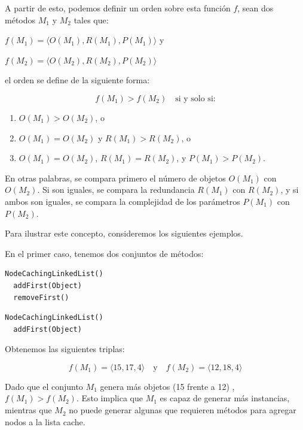 A partir de esto, podemos definir un orden sobre esta función $f$, sean dos
métodos $M_1$ y $M_2$ tales que: 

\( f(M_1) = \langle O(M_1), R(M_1), P(M_1) \rangle \) y

\( f(M_2) = \langle O(M_2), R(M_2), P(M_2) \rangle \) 
\vspace{5pt} 

el orden se define de la siguiente forma:

\[
f(M_1) > f(M_2) \quad \text{si y solo si:}
\]

\begin{enumerate}
    \item \( O(M_1) > O(M_2) \), o
    \item \( O(M_1) = O(M_2) \) y \( R(M_1) > R(M_2) \), o
    \item \( O(M_1) = O(M_2) \), \( R(M_1) = R(M_2) \), y \( P(M_1) > P(M_2) \).
\end{enumerate}

En otras palabras, se compara primero el número de objetos \( O(M_1) \) con \( O(M_2) \). 
Si son iguales, se compara la redundancia \( R(M_1) \) con \( R(M_2) \), y si ambos son iguales, 
se compara la complejidad de los parámetros \( P(M_1) \) con \( P(M_2) \).

Para ilustrar este concepto, consideremos los siguientes ejemplos.

En el primer caso, tenemos dos conjuntos de métodos:
\vspace{5pt} 

\begin{lstlisting}[numbers=none, caption=Conjunto de métodos \( M_1 \)]
  NodeCachingLinkedList()
  addFirst(Object)
  removeFirst()
\end{lstlisting} 


\begin{lstlisting}[numbers=none, caption=Conjunto de métodos \( M_2 \)]
  NodeCachingLinkedList()
  addFirst(Object)
\end{lstlisting}


Obtenemos las siguientes triplas:

\[
f(M_1) = \langle 15, 17, 4 \rangle \quad \text{y} \quad f(M_2) = \langle 12, 18, 4 \rangle
\]

Dado que el conjunto \( M_1 \) genera más objetos (15 frente a 12) , \( f(M_1) > f(M_2) \). Esto implica que \( M_1 \) es capaz de generar más instancias, mientras que \( M_2 \) no puede generar algunas que requieren métodos para agregar nodos a la lista cache.

